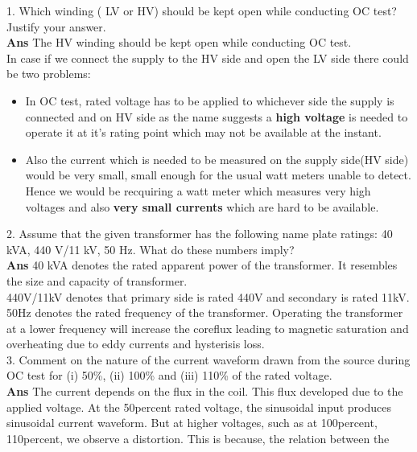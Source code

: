 \documentclass[12pt]{article}
\begin{document}
    
    1. Which winding ( LV or HV) should be kept open while conducting OC test? Justify your answer.
    \vspace{0.1cm} \\
    \textbf{Ans} The HV winding should be kept open while conducting OC test.\\
    In case if we connect the supply to the HV side and open the LV side there could be two problems:
    \begin{itemize}
        \item In OC test, rated voltage has to be applied to whichever side the supply is connected and on HV side as the name suggests a \textbf{high voltage} is needed to operate it at it's rating point which may not be available at the instant.
        \item Also the current which is needed to be measured on the supply side(HV side) would be very small, small enough for the usual watt meters unable to detect. Hence we would be recquiring a watt meter which measures very high voltages and also \textbf{very small currents} which are hard to be available.    
    \end{itemize}
    2. Assume that the given transformer has the following name plate ratings:
    40 kVA, 440 V/11 kV, 50 Hz. What do these numbers imply?
    \vspace{0.1cm} \\
    \textbf{Ans} 40 kVA denotes the rated apparent power of the transformer. It resembles the size and capacity of transformer.\\
    440V/11kV denotes that primary side is rated 440V and secondary is rated 11kV.\\
    50Hz denotes the rated frequency of the transformer. Operating the transformer at a lower frequency will increase the coreflux leading to magnetic saturation and overheating due to eddy currents and hysterisis loss.\vspace{0.2cm} \\
    3. Comment on the nature of the current waveform drawn from the source during OC test for (i)
    50\%, (ii) 100\% and (iii) 110\% of the rated voltage.
    \vspace{0.1cm} \\
    \textbf{Ans} The current depends on the flux in the coil. This flux developed due to the
applied voltage. At the 50percent rated voltage, the sinusoidal input produces
sinusoidal current waveform. But at higher voltages, such as at 100percent,
110percent, we observe a distortion. This is because, the relation between the
\end{document}
